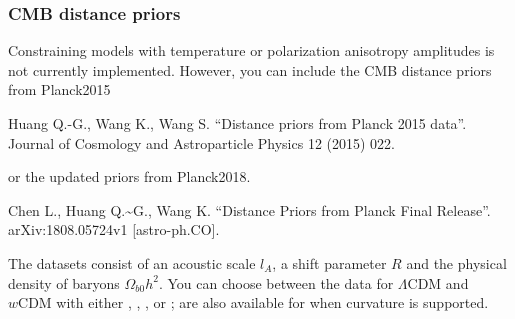 \documentclass[letterpaper,12pt,english]{sphinxhowto}
\begin{document}
\subsubsection{CMB distance priors}
\label{\detokenize{thedata:cmb-distance-priors}}
Constraining models with temperature or polarization anisotropy amplitudes is
not currently implemented.
However, you can include the CMB distance priors from Planck2015 %
\begin{footnote}[2]\sphinxAtStartFootnote
Huang Q.-G., Wang K., Wang S. “Distance priors from Planck 2015 data”. Journal of Cosmology and Astroparticle Physics 12 (2015) 022.
%
\end{footnote}
or the updated priors from Planck2018. %
\begin{footnote}[3]\sphinxAtStartFootnote
Chen L., Huang Q.\textasciitilde{}G., Wang K. “Distance Priors from Planck Final Release”. arXiv:1808.05724v1 {[}astro-ph.CO{]}.
%
\end{footnote}
The datasets consist of an acoustic scale \(l_A\), a shift parameter
\(R\) and the physical density of baryons \(\Omega_{b0}h^2\).
You can choose between the data for \(\Lambda\text{CDM}\) and
\(w\text{CDM}\) with either ,
, , or
;
 are also available for when curvature is
supported.
\end{document}
